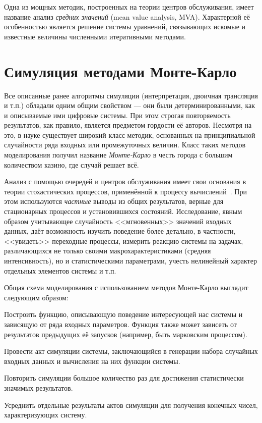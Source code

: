Одна из мощных методик, построенных на теории центров обслуживания, имеет название анализ \textit{средних значений} (\abbr mean value analysis, MVA). Характерной её особенностью является решение системы уравнений, связывающих искомые и известные величины численными итеративными методами.

\section{Симуляция методами Монте-Карло}

Все описанные ранее алгоритмы симуляции (интерпретация, двоичная трансляция и т.п.) обладали одним общим свойством --- они были детерминированными, как и описываемые ими цифровые системы. При этом строгая повторяемость результатов,  как правило, является предметом гордости её авторов. Несмотря на это, в науке существует широкий класс методик, основанных на принципиальной случайности ряда входных или промежуточных величин. Класс таких методов моделирования получил название \textit{Монте-Карло} в честь города с большим количеством казино, где случай решает всё.

Анализ с помощью очередей и центров обслуживания имеет свои основания в теории стохастических процессов, применённой к процессу вычислений~\cite{allen1990}. При этом используются \emph{частные} выводы из общих результатов, верные для стационарных процессов и установившихся состояний. Исследование, явным образом учитывающее случайность <<мгновенных>> значений входных данных, даёт возможность изучить поведение более детально, в частности, <<увидеть>> переходные процессы, измерить реакцию системы на задачах, различающихся не только своими макрохарактеристиками (средняя интенсивность), но и статистическими параметрами, учесть нелинейный характер отдельных элементов системы и т.п.
 
Общая схема моделирования с использованием методов Монте-Карло выглядит следующим образом:

\begin{enumerate*}
\item Построить функцию, описывающую поведение интересующей нас системы и зависящую от ряда входных параметров. Функция также может зависеть от результатов предыдущих её запусков (например, быть марковским процессом).

\item Провести акт симуляции системы, заключающийся в генерации набора случайных входных данных и вычисления на них функции системы.

\item Повторить симуляции большое количество раз для достижения статистически значимых результатов.

\item Усреднить отдельные результаты актов симуляции для получения конечных чисел, характеризующих систему.
\end{enumerate*}

